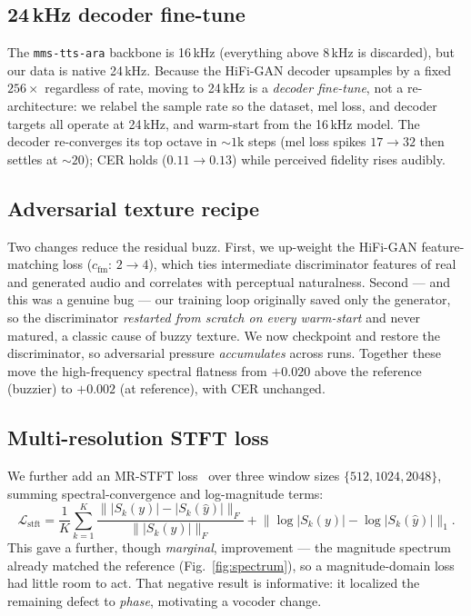 \documentclass[10pt,twocolumn]{article}
\begin{document}
\subsection{24\,kHz decoder fine-tune}
The \texttt{mms-tts-ara} backbone is 16\,kHz (everything above 8\,kHz is discarded), but our
data is native 24\,kHz. Because the HiFi-GAN decoder upsamples by a fixed \(256\times\)
regardless of rate, moving to 24\,kHz is a \emph{decoder fine-tune}, not a re-architecture:
we relabel the sample rate so the dataset, mel loss, and decoder targets all operate at
24\,kHz, and warm-start from the 16\,kHz model. The decoder re-converges its top octave in
\(\sim\!1\)k steps (mel loss spikes \(17\!\rightarrow\!32\) then settles at \(\sim\!20\)); CER
holds (\(0.11\!\rightarrow\!0.13\)) while perceived fidelity rises audibly.

\subsection{Adversarial texture recipe}
Two changes reduce the residual buzz. First, we up-weight the HiFi-GAN feature-matching loss
(\(c_{\text{fm}}\!:\,2\!\rightarrow\!4\)), which ties intermediate discriminator features of
real and generated audio and correlates with perceptual naturalness. Second --- and this was
a genuine bug --- our training loop originally saved only the generator, so the discriminator
\emph{restarted from scratch on every warm-start} and never matured, a classic cause of
buzzy texture. We now checkpoint and restore the discriminator, so adversarial pressure
\emph{accumulates} across runs. Together these move the high-frequency spectral flatness from
\(+0.020\) above the reference (buzzier) to \(+0.002\) (at reference), with CER unchanged.

\subsection{Multi-resolution STFT loss}
We further add an MR-STFT loss~\cite{pwg} over three window sizes
\(\{512,1024,2048\}\), summing spectral-convergence and log-magnitude terms:
\begin{equation}
\mathcal{L}_{\text{stft}}=\frac{1}{K}\sum_{k=1}^{K}
\frac{\lVert |S_k(y)|-|S_k(\hat y)|\rVert_F}{\lVert |S_k(y)|\rVert_F}
+\big\lVert \log|S_k(y)|-\log|S_k(\hat y)|\big\rVert_1 .
\end{equation}
This gave a further, though \emph{marginal}, improvement --- the magnitude spectrum already
matched the reference (Fig.~\ref{fig:spectrum}), so a magnitude-domain loss had little room to
act. That negative result is informative: it localized the remaining defect to \emph{phase},
motivating a vocoder change.
\end{document}
